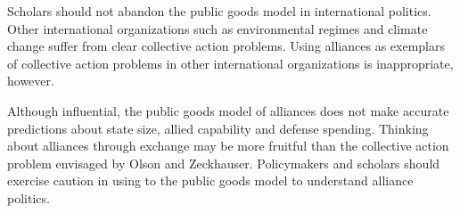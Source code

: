 \documentclass[12pt]{article}
\begin{document}
Scholars should not abandon the public goods model in international politics. 
Other international organizations such as environmental regimes and climate change suffer from clear collective action problems.  
Using alliances as exemplars of collective action problems in other international organizations is inappropriate, however. 


Although influential, the public goods model of alliances does not make accurate predictions about state size, allied capability and defense spending. 
Thinking about alliances through exchange may be more fruitful than the collective action problem envisaged by Olson and Zeckhauser.
Policymakers and scholars should exercise caution in using to the public goods model to understand alliance politics.  



\singlespace


 
\end{document}
